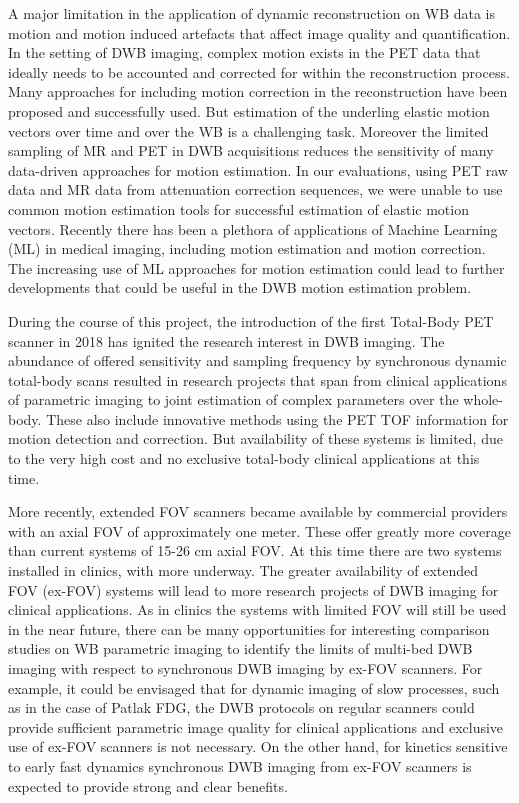 A major limitation in the application of dynamic reconstruction on WB data is motion and motion induced artefacts that affect image quality and quantification. 
In the setting of DWB imaging, complex motion exists in the PET data that ideally needs to be accounted and corrected for within the reconstruction process. 
Many approaches for including motion correction in the reconstruction have been proposed and successfully used. But estimation of the underling elastic motion vectors over time and over the WB is a challenging task. Moreover the limited sampling of MR and PET in DWB acquisitions reduces the sensitivity of many data-driven approaches for motion estimation. In our evaluations, using PET raw data and MR data from attenuation correction sequences, we were unable to use common motion estimation tools for successful estimation of elastic motion vectors.
Recently there has been a plethora of applications of Machine Learning (ML) in medical imaging, including motion estimation and motion correction.
The increasing use of ML approaches for motion estimation could lead to further developments that could be useful in the DWB motion estimation problem.

During the course of this project, the introduction of the first Total-Body PET scanner in 2018 has ignited the research interest in DWB imaging. The abundance of offered sensitivity and sampling frequency by synchronous dynamic total-body scans resulted in research projects that span from clinical applications of parametric imaging to joint estimation of complex parameters over the whole-body. These also include innovative methods using the PET TOF information for motion detection and correction.
But availability of these systems is limited, due to the very high cost and no exclusive total-body clinical applications at this time.

More recently, extended FOV scanners became available by commercial providers with an axial FOV of approximately one meter. These offer greatly more coverage than current systems of 15-26 cm axial FOV. At this time there are two systems installed in clinics, with more underway. The greater availability of extended FOV (ex-FOV) systems will lead to more research projects of DWB imaging for clinical applications. As in clinics the systems with limited FOV will still be used in the near future, there can be many opportunities for interesting comparison studies on WB parametric imaging to identify the limits of multi-bed DWB imaging with respect to synchronous DWB imaging by ex-FOV scanners.
For example, it could be envisaged that for dynamic imaging of slow processes, such as in the case of Patlak FDG, the DWB protocols on regular scanners could provide sufficient parametric image quality for clinical applications and exclusive use of ex-FOV scanners is not necessary. On the other hand, for kinetics sensitive to early fast dynamics synchronous DWB imaging from ex-FOV scanners is expected to provide strong and clear benefits.


